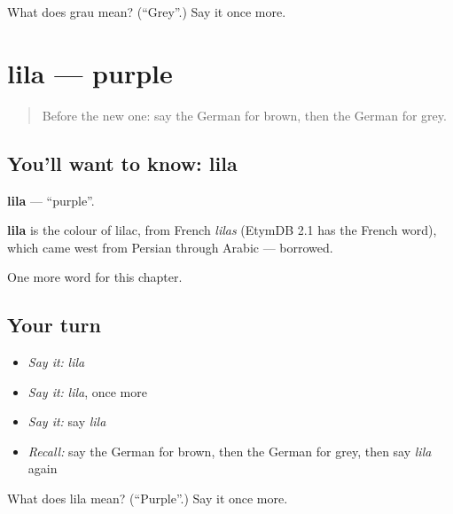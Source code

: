 \begin{tcolorbox}[breakable,colback=teal!4,colframe=teal!35!black,title={Before you move on}]
What does grau mean? (\textquotedblleft{}Grey\textquotedblright{}.) Say it once more.
\end{tcolorbox}
\section[lila]{lila — purple}

\label{lesson:GE-C94-lila}



\begin{quote}
Before the new one: say the German for brown, then the German for grey.
\end{quote}

\subsection*{You'll want to know: lila}
\textbf{lila} — \textquotedblleft{}purple\textquotedblright{}.

\begin{cousinweb}
\textbf{lila} is the colour of lilac, from French \emph{lilas} (EtymDB 2.1 has the French word), which came west from Persian through Arabic — borrowed.
\end{cousinweb}

\begin{grammarlens}[title={What you've built}]
One more word for this chapter.
\end{grammarlens}

\subsection*{Your turn}
\begin{itemize}
\raggedright
  \item \emph{Say it:} \emph{lila}
  \item \emph{Say it:} \emph{lila}, once more
  \item \emph{Say it:} say \emph{lila}
  \item \emph{Recall:} say the German for brown, then the German for grey, then say \emph{lila} again
\end{itemize}

\begin{tcolorbox}[breakable,colback=teal!4,colframe=teal!35!black,title={Before you move on}]
What does lila mean? (\textquotedblleft{}Purple\textquotedblright{}.) Say it once more.
\end{tcolorbox}
